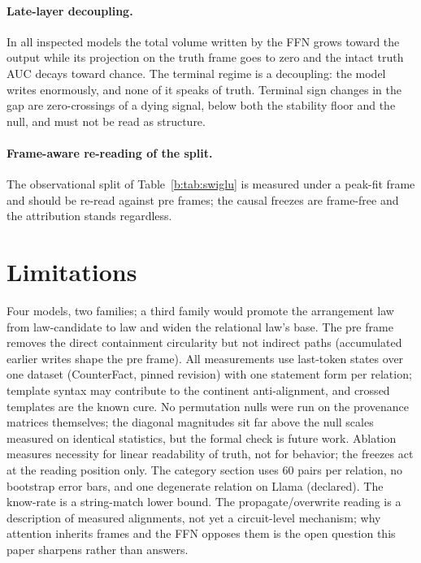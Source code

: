 \documentclass[11pt]{article}
\begin{document}
\paragraph{Late-layer decoupling.} In all inspected models the total
volume written by the FFN grows toward the output while its projection on
the truth frame goes to zero and the intact truth AUC decays toward
chance. The terminal regime is a decoupling: the model writes enormously,
and none of it speaks of truth. Terminal sign changes in the gap are
zero-crossings of a dying signal, below both the stability floor and the
null, and must not be read as structure.

\paragraph{Frame-aware re-reading of the split.} The observational split
of Table~\ref{b:tab:swiglu} is measured under a peak-fit frame and should be
re-read against pre frames; the causal freezes are frame-free and the
attribution stands regardless.

\section{Limitations}
\label{b:sec:limits}

Four models, two families; a third family would promote the arrangement
law from law-candidate to law and widen the relational law's base. The pre
frame removes the direct containment circularity but not indirect paths
(accumulated earlier writes shape the pre frame). All measurements use
last-token states over one dataset (CounterFact, pinned revision) with one
statement form per relation; template syntax may contribute to the
continent anti-alignment, and crossed templates are the known cure. No
permutation nulls were run on the provenance matrices themselves; the
diagonal magnitudes sit far above the null scales measured on identical
statistics, but the formal check is future work. Ablation measures
necessity for linear readability of truth, not for behavior; the freezes
act at the reading position only. The category section uses $60$ pairs per
relation, no bootstrap error bars, and one degenerate relation on Llama
(declared). The know-rate is a string-match lower bound. The
propagate/overwrite reading is a description of measured alignments, not
yet a circuit-level mechanism; why attention inherits frames and the FFN
opposes them is the open question this paper sharpens rather than answers.
\end{document}
